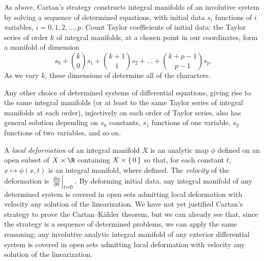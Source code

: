 %
As above, Cartan's strategy constructs integral manifolds of an involutive system by solving a sequence of determined equations, with initial data \(s_i\) functions of \(i\) variables, \(i=0,1,2,\dots,p\).
Count Taylor coefficients of initial data: the Taylor series of order \(k\) of integral manifolds, at a chosen point in our coordinates, form a manifold of dimension
\[
s_0+\binom{k}{0}s_1+\binom{k+1}{1}s_2+\dots+\binom{k+p-1}{p-1}s_p.
\]
As we vary \(k\), these dimensions of determine all of the characters.

Any other choice of determined systems of differential equations, giving rise to the same integral manifolds (or at least to the same Taylor series of integral manifolds at each order), injectively on each order of Taylor series, also has general solution depending on \(s_0\) constants, \(s_1\) functions of one variable, \(s_2\) functions of two variables, and so on.

%
A \emph{local deformation} of an integral manifold \(X\) is an analytic map \(\phi\) defined on an open subset of \(X\times\R\)  containing \(X\times\set{0}\) so that, for each constant \(t\), \(x\mapsto\phi(x,t)\) is an integral manifold, where defined.
The \emph{velocity} of the deformation is
\(
\left.\pderiv{\phi}{t}\right|_{t=0}.
\)
By deforming initial data, any integral manifold of any determined system is covered in open sets admitting local deformation with velocity any solution of the linearization.
We have not yet justified Cartan's strategy to prove the Cartan--K\"ahler theorem, but we can already see that, since the strategy is a sequence of determined problems, we can apply the same reasoning;
any involutive analytic integral manifold of any exterior differential system is covered in open sets admitting local deformation with velocity any solution of the linearization.

